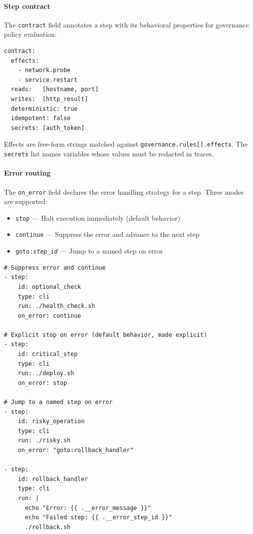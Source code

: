 \paragraph{Step contract}

The \texttt{contract} field annotates a step with its behavioral properties for
governance policy evaluation:

\begin{verbatim}
contract:
  effects:
    - network.probe
    - service.restart
  reads:   [hostname, port]
  writes:  [http_result]
  deterministic: true
  idempotent: false
  secrets: [auth_token]
\end{verbatim}

Effects are free-form strings matched against \texttt{governance.rules[].effects}.
The \texttt{secrets} list names variables whose values must be redacted in traces.

\paragraph{Error routing}
\label{subsec:on-error}

The \texttt{on\_error} field declares the error handling strategy for a step.
Three modes are supported:

\begin{itemize}
  \item \texttt{stop} — Halt execution immediately (default behavior)
  \item \texttt{continue} — Suppress the error and advance to the next step
  \item \texttt{goto:\textit{step\_id}} — Jump to a named step on error
\end{itemize}

\begin{verbatim}
# Suppress error and continue
- step:
    id: optional_check
    type: cli
    run: ./health_check.sh
    on_error: continue

# Explicit stop on error (default behavior, made explicit)
- step:
    id: critical_step
    type: cli
    run: ./deploy.sh
    on_error: stop

# Jump to a named step on error
- step:
    id: risky_operation
    type: cli
    run: ./risky.sh
    on_error: "goto:rollback_handler"

- step:
    id: rollback_handler
    type: cli
    run: |
      echo "Error: {{ .__error_message }}"
      echo "Failed step: {{ .__error_step_id }}"
      ./rollback.sh
\end{verbatim}

